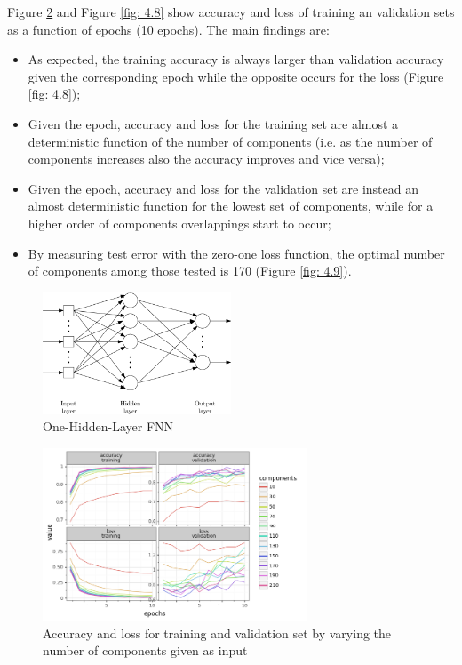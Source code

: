 \documentclass[10pt,english, openany]{book}
\begin{document}
Figure \ref{fig: 4.7} and Figure \ref{fig: 4.8} show accuracy and loss of training an validation sets as a function of epochs (10 epochs). The main findings are:

\begin{itemize}
    \item As expected, the training accuracy is always larger than validation accuracy given the corresponding epoch while the opposite occurs for the loss (Figure \ref{fig: 4.8});
    \item Given the epoch, accuracy and loss for the training set are almost a deterministic function of the number of components (i.e. as the number of components increases also the accuracy improves and vice versa);
    \item Given the epoch, accuracy and loss for the validation set are instead an almost deterministic function for the lowest set of components, while for a higher order of components overlappings start to occur;
    \item By measuring test error with the zero-one loss function, the optimal number of components among those tested is 170 (Figure \ref{fig: 4.9}).
\end{itemize}



\begin{figure}[H]
    \centering
    \includegraphics[width=0.5\textwidth]{Images/FFNN.png}
    \caption{\label{fig: 4.6}One-Hidden-Layer FNN}
\end{figure}



\begin{figure}[H]
    \centering
    \includegraphics[width=0.7\textwidth]{Images/1.5. Accuracy and loss with different components details.png}
    \caption{\label{fig: 4.7}Accuracy and loss for training and validation set by varying the number of components given as input}
\end{figure}
\end{document}
